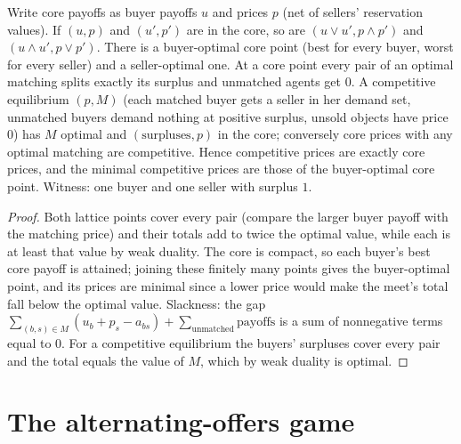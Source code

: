 \begin{theorem}
\label{thm:assignment-lattice}
\leanok
{}
Write core payoffs as buyer payoffs $u$ and prices $p$ (net of sellers' reservation values). If $(u,p)$ and $(u',p')$
are in the core, so are $(u \vee u', p \wedge p')$ and $(u \wedge u', p \vee p')$. There is a buyer-optimal core point
(best for every buyer, worst for every seller) and a seller-optimal one. At a core point every pair of an optimal
matching splits exactly its surplus and unmatched agents get $0$. A competitive equilibrium $(p, M)$ (each matched
buyer gets a seller in her demand set, unmatched buyers demand nothing at positive surplus, unsold objects have price
$0$) has $M$ optimal and $(\text{surpluses}, p)$ in the core; conversely core prices with any optimal matching are
competitive. Hence competitive prices are exactly core prices, and the minimal competitive prices are those of the
buyer-optimal core point. Witness: one buyer and one seller with surplus $1$.
\end{theorem}
\begin{proof}
\leanok
Both lattice points cover every pair (compare the larger buyer payoff with the matching price) and their totals add
to twice the optimal value, while each is at least that value by weak duality. The core is compact, so each buyer's
best core payoff is attained; joining these finitely many points gives the buyer-optimal point, and its prices are
minimal since a lower price would make the meet's total fall below the optimal value. Slackness: the gap
$\sum_{(b,s)\in M}(u_b + p_s - a_{bs}) + \sum_{\text{unmatched}} \text{payoffs}$ is a sum of nonnegative terms equal to $0$.
For a competitive equilibrium the buyers' surpluses cover every pair and the total equals the value of $M$, which by
weak duality is optimal.
\end{proof}

\section{The alternating-offers game}
\label{sec:rubinstein-game}

